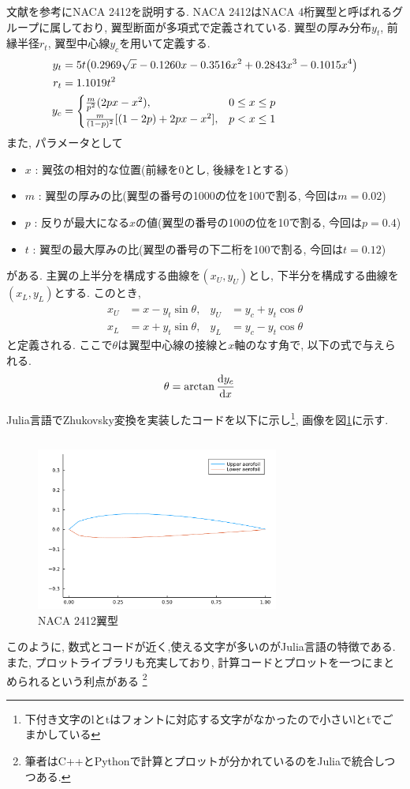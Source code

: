 \documentclass{ltjsarticle}
\begin{document}
文献\cite{Rinoie2011}を参考にNACA 2412を説明する.
NACA 2412はNACA 4桁翼型と呼ばれるグループに属しており, 翼型断面が多項式で定義されている.
翼型の厚み分布$y_t$, 前縁半径$r_t$, 翼型中心線$y_c$を用いて定義する.
\begin{align}
    y_t &= 5t \qty(0.2969 \sqrt{x} - 0.1260 x - 0.3516 x^2 + 0.2843 x^3 - 0.1015 x^4) \\
    r_t &= 1.1019t^2 \\
    y_c &=
    \begin{cases}
        \frac{m}{p^2}(2px-x^2),& 0\leq x\leq p\\
        \frac{m}{(1-p)^2}[(1-2p)+2px-x^2],& p< x\leq 1
    \end{cases}
\end{align}
また, パラメータとして
\begin{itemize}
    \item $x$ : 翼弦の相対的な位置(前縁を0とし, 後縁を1とする)
    \item $m$ : 翼型の厚みの比(翼型の番号の1000の位を100で割る, 今回は$m=0.02$)
    \item $p$ : 反りが最大になる$x$の値(翼型の番号の100の位を10で割る, 今回は$p=0.4$)
    \item $t$ : 翼型の最大厚みの比(翼型の番号の下二桁を100で割る, 今回は$t=0.12$)
\end{itemize}
がある.
主翼の上半分を構成する曲線を$(x_U,y_U)$とし, 下半分を構成する曲線を$(x_L,y_L)$とする.
このとき,
\begin{align}
    x_U &= x-y_t\sin{\theta},&y_U &= y_c+y_t\cos{\theta}\\
    x_L &= x+y_t\sin{\theta},&y_L &= y_c-y_t\cos{\theta}
\end{align}
と定義される\cite{Abbott1945}.
ここで$\theta$は翼型中心線の接線と$x$軸のなす角で, 以下の式で与えられる.
\begin{align}
    \theta &= \arctan{\dv{y_c}{x}}
\end{align}

Julia言語でZhukovsky変換を実装したコードを以下に示し\footnote{下付き文字のlとtはフォントに対応する文字がなかったので小さいlとtでごまかしている}, 
画像を図\ref{fig:NACA2412}に示す.

\inputminted[linenos, breaklines]{julia}{plot_NACA2412.jl}
\begin{figure}[htbp]
    \centering
    \includegraphics[width=8cm]{NACA2412.pdf}
    \caption{NACA 2412翼型}
    \label{fig:NACA2412}
\end{figure}
このように, 数式とコードが近く,使える文字が多いのがJulia言語の特徴である.
また, プロットライブラリも充実しており, 計算コードとプロットを一つにまとめられるという利点がある
\footnote{筆者はC++とPythonで計算とプロットが分かれているのをJuliaで統合しつつある.}
\end{document}

